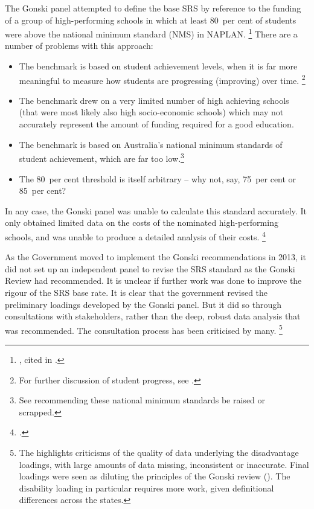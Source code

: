 \documentclass{grattan}
\begin{document}
The Gonski panel attempted to define the base SRS by reference to the funding of a group of high-performing schools in which at least 80~per cent of students were above the national minimum standard (NMS) in NAPLAN.%
\footnote{\textcite{Justman2013WhatsWrongGonski}, cited in \textcite{SenBackn.d.GovernmentSenatorsDissenting}.}
There are a number of problems with this approach:

\begin{itemize}[itemsep=1.2ex]
\item The benchmark is based on student achievement levels, when it is far more meaningful to measure how students are progressing (improving) over time.%
\footnote{For further discussion of student progress, see \textcites{Goss-2016-Widening-gaps-NAPLAN}{Jensen2010MeasuringWhatMatters}.}
\item The benchmark drew on a very limited number of high achieving schools (that were most likely also high socio-economic schools) which may not accurately represent the amount of funding required for a good education.
\item The benchmark is based on Australia's national minimum standards of student achievement, which are far too low.\footnote{See \textcite{Goss-2016-Widening-gaps-NAPLAN}  recommending these national minimum standards be raised or scrapped.}
\item The 80~per cent threshold is itself arbitrary -- why not, say, 75~per cent or 85~per cent?
\end{itemize}

In any case, the Gonski panel was unable to calculate this standard accurately. It only obtained limited data on the costs of the nominated high-performing schools, and was unable to produce a detailed analysis of their costs.%
\footnote{\textcite{NCA2014TowardsResponsibleGovernment}.}

As the Government moved to implement the Gonski recommendations in 2013, it did not set up an independent panel to revise the SRS standard as the Gonski Review had recommended. It is unclear if further work was done to improve the rigour of the SRS base rate. It is clear that the government revised the preliminary loadings developed by the Gonski panel. But it did so through consultations with stakeholders, rather than the deep, robust data analysis that was recommended. The consultation process has been criticised by many.%
\footnote{The \textcite{NCA2014TowardsResponsibleGovernment} highlights criticisms of the quality of data underlying the disadvantage loadings, with large amounts of data missing, inconsistent or inaccurate. Final loadings were seen as diluting the principles of the Gonski review (\textcite[][42]{Connors2015ImperativesSchoolsFunding}).
The disability loading in particular requires more work, given definitional differences across the states.}
\end{document}
